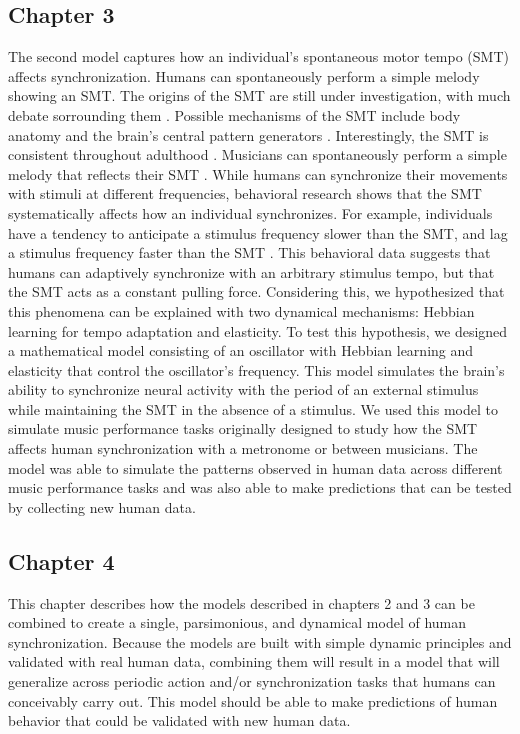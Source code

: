 \documentclass{report}
\begin{document}
\subsection{Chapter 3}
The second model captures how an individual's spontaneous motor tempo (SMT) affects synchronization. Humans can spontaneously perform a simple melody showing an SMT. The origins of the SMT are still under investigation, with much debate sorrounding them \cite{scheurich2018tapping}. Possible mechanisms of the SMT include body anatomy and the brain's central pattern generators \cite{scheurich2018tapping}. Interestingly, the SMT is consistent throughout adulthood \cite{scheurich2018tapping}. Musicians can spontaneously perform a simple melody that reflects their SMT \cite{scheurich2018tapping}. While humans can synchronize their movements with stimuli at different frequencies, behavioral research shows that the SMT systematically affects how an individual synchronizes. For example, individuals have a tendency to anticipate a stimulus frequency slower than the SMT, and lag a stimulus frequency faster than the SMT \cite{scheurich2018tapping}. This behavioral data suggests that humans can adaptively synchronize with an arbitrary stimulus tempo, but that the SMT acts as a constant pulling force. Considering this, we hypothesized that this phenomena can be explained with two dynamical mechanisms: Hebbian learning for tempo adaptation and elasticity. To test this hypothesis, we designed a mathematical model consisting of an oscillator with Hebbian learning and elasticity that control the oscillator's frequency. This model simulates the brain's ability to synchronize neural activity with the period of an external stimulus while maintaining the SMT in the absence of a stimulus. We used this model to simulate music performance tasks originally designed to study how the SMT affects human synchronization with a metronome or between musicians. The model was able to simulate the patterns observed in human data across different music performance tasks and was also able to make predictions that can be tested by collecting new human data.

\subsection{Chapter 4}
This chapter describes how the models described in chapters 2 and 3 can be combined to create a single, parsimonious, and dynamical model of human synchronization. Because the models are built with simple dynamic principles and validated with real human data, combining them will result in a model that will generalize across periodic action and/or synchronization tasks that humans can conceivably carry out. This model should be able to make predictions of human behavior that could be validated with new human data.
\end{document}
